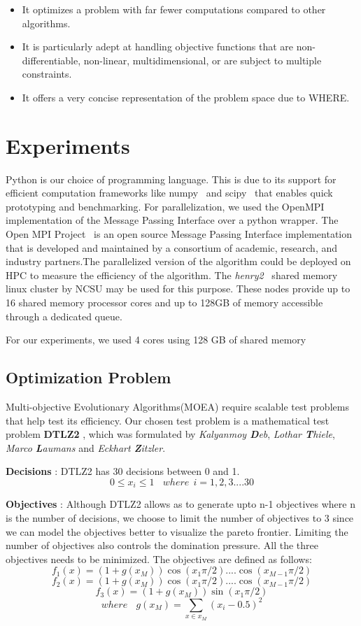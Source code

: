 \documentclass[conference]{IEEEtran}
\begin{document}
\begin{itemize}
\item It optimizes a problem with far fewer computations compared to other algorithms.
\item It is particularly adept at handling objective functions that are non-differentiable, non-linear, multidimensional, or are subject to multiple constraints.
\item It offers a very concise representation of the problem space due to WHERE.
\end{itemize}

\section{Experiments}
Python is our choice of programming language. This is due to its support for efficient computation frameworks like numpy~\cite{numpy} and scipy~\cite{scipy} that enables quick prototyping and benchmarking.
For parallelization,  we used the OpenMPI implementation of the Message Passing Interface over a python wrapper. The Open MPI Project~\cite{openMPITool} is an open source Message Passing Interface implementation that is developed and maintained by a consortium of academic, research, and industry partners.The parallelized version of the algorithm could be deployed on HPC to measure the efficiency of the algorithm. The \textit{henry2}~\cite{ncsuHPC} shared memory linux cluster by NCSU may be used for this purpose. These nodes provide up to 16 shared memory processor cores and up to 128GB of memory accessible through a dedicated queue. 

For our experiments, we used 4 cores using 128 GB of shared memory

\subsection{Optimization Problem}
\label{problem}

Multi-objective Evolutionary Algorithms(MOEA) require scalable test problems that help test its efficiency. Our chosen test problem is a mathematical test problem \textbf{DTLZ2} \cite{debMOEA02}, which was formulated by \textit{Kalyanmoy \textbf{D}eb}, \textit{Lothar \textbf{T}hiele}, \textit{Marco \textbf{L}aumans} and \textit{Eckhart \textbf{Z}itzler}. 

\textbf{Decisions} : DTLZ2 has 30 decisions between 0 and 1.
\[0 \leq {x}_{i} \leq 1 \ \ \ \ where \ \  i = 1,2 ,3 .... 30\]

\textbf{Objectives} : Although DTLZ2 allows as to generate upto n-1 objectives where n is the number of decisions, we choose to limit the number of objectives to 3 since we can model the objectives better to visualize the pareto frontier. Limiting the number of objectives also controls the domination pressure. All the three objectives needs to be minimized. The objectives are defined as follows:
\[{f}_{1}(x) = (1+g({x}_{M}))\cos({x}_{1} \pi/2)....\cos({x}_{M-1} \pi/2)\]
\[{f}_{2}(x) = (1+g({x}_{M}))\cos({x}_{1} \pi/2)....\cos({x}_{M-1} \pi/2)\]
\[{f}_{3}(x) = (1+g({x}_{M}))\sin({x}_{1} \pi/2)\]
\[where \ \ \ \ g({x}_{M}) = \sum_{x \in {x}_{M}} (x_i - 0.5)^2 \]
\end{document}
